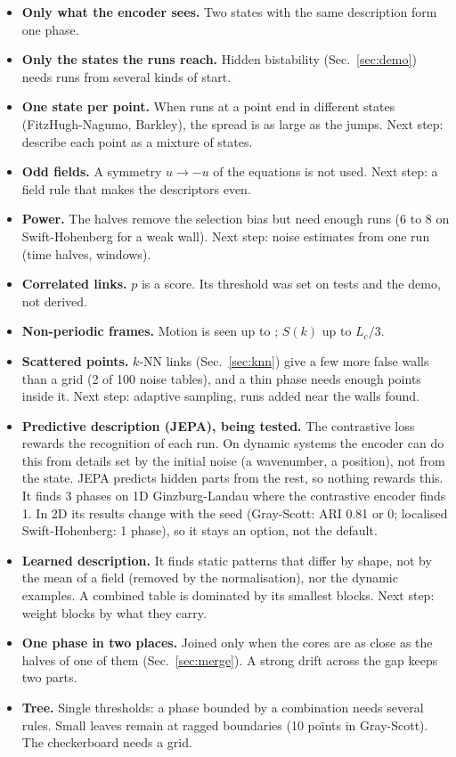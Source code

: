 \documentclass[11pt,a4paper]{article}
\newcommand{\code}[1]{\texttt{\detokenize{#1}}}
\begin{document}
\begin{itemize}[leftmargin=1.2em, itemsep=1pt]
\item \textbf{Only what the encoder sees.} Two states with the same description form one phase.
\item \textbf{Only the states the runs reach.} Hidden bistability (Sec.~\ref{sec:demo}) needs runs
  from several kinds of start.
\item \textbf{One state per point.} When runs at a point end in different states (FitzHugh-Nagumo,
  Barkley), the spread is as large as the jumps. Next step: describe each point as a mixture of
  states.
\item \textbf{Odd fields.} A symmetry $u\to-u$ of the equations is not used. Next step: a field rule
  that makes the descriptors even.
\item \textbf{Power.} The halves remove the selection bias but need enough runs (6 to 8 on
  Swift-Hohenberg for a weak wall). Next step: noise estimates from one run (time halves, windows).
\item \textbf{Correlated links.} $p$ is a score. Its threshold was set on tests and the demo, not
  derived.
\item \textbf{Non-periodic frames.} Motion is seen up to \code{max_shift}; $S(k)$ up to $L_c/3$.
\item \textbf{Scattered points.} $k$-NN links (Sec.~\ref{sec:knn}) give a few more false walls than a
  grid (2 of 100 noise tables), and a thin phase needs enough points inside it. Next step: adaptive
  sampling, runs added near the walls found.
\item \textbf{Predictive description (JEPA), being tested.} The contrastive loss rewards the
  recognition of each run. On dynamic systems the encoder can do this from details set by the
  initial noise (a wavenumber, a position), not from the state. JEPA predicts hidden parts from the
  rest, so nothing rewards this. It finds 3 phases on 1D Ginzburg-Landau where the contrastive
  encoder finds 1. In 2D its results change with the seed (Gray-Scott: ARI 0.81 or 0; localised
  Swift-Hohenberg: 1 phase), so it stays an option, not the default.
\item \textbf{Learned description.} It finds static patterns that differ by shape, not by the mean
  of a field (removed by the normalisation), nor the dynamic examples. A combined table is dominated
  by its smallest blocks. Next step: weight blocks by what they carry.
\item \textbf{One phase in two places.} Joined only when the cores are as close as the halves of
  one of them (Sec.~\ref{sec:merge}). A strong drift across the gap keeps two parts.
\item \textbf{Tree.} Single thresholds: a phase bounded by a combination needs several rules. Small
  leaves remain at ragged boundaries (10 points in Gray-Scott). The checkerboard needs a grid.
\end{itemize}
\end{document}
